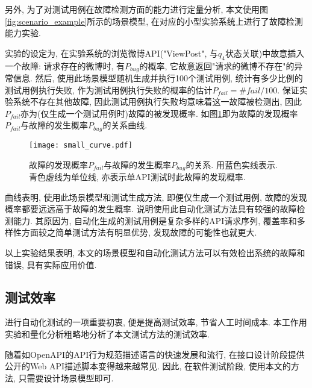             另外, 为了对测试用例在故障检测方面的能力进行定量分析, 本文使用图\ref{fig:scenario_example}所示的场景模型, 在对应的小型实验系统上进行了故障检测能力实验.
            
            实验的设定为, 在实验系统的浏览微博API("ViewPost", 与$q_4$状态关联)中故意插入一个故障: 请求存在的微博时, 有$P_{bug}$的概率, 它故意返回"请求的微博不存在"的异常信息. 然后, 使用此场景模型随机生成并执行100个测试用例, 统计有多少比例的测试用例执行失败, 作为测试用例执行失败的概率的估计$P_{fail} = \# fail / 100$. 保证实验系统不存在其他故障, 因此测试用例执行失败均意味着这一故障被检测出, 因此$P_{fail}$亦为(仅生成一个测试用例时)故障的被发现概率. 如图\ref{fig:pbug_pfail_graph}即为故障的发现概率$P_{fail}$与故障的发生概率$P_{bug}$的关系曲线.
            \begin{figure}[!htb]
                \centering
                \texttt{[image: small\_curve.pdf]}
                \caption[故障的发现概率$P_{fail}$与发生概率$P_{bug}$的关系]{故障的发现概率$P_{fail}$与故障的发生概率$P_{bug}$的关系. 用蓝色实线表示. 青色虚线为单位线, 亦表示单API测试时此故障的发现概率.}
                \label{fig:pbug_pfail_graph}
            \end{figure}
            曲线表明, 使用此场景模型和测试生成方法, 即便仅生成一个测试用例, 故障的发现概率都要远远高于故障的发生概率. 说明使用此自动化测试方法具有较强的故障检测能力. 其原因为, 自动化生成的测试用例是复杂多样的API请求序列, 覆盖率和多样性方面较之简单测试方法有明显优势, 发现故障的可能性也就更大.
            
            以上实验结果表明, 本文的场景模型和自动化测试方法可以有效检出系统的故障和错误, 具有实际应用价值.
    
        \subsection{测试效率}
    
            进行自动化测试的一项重要初衷, 便是提高测试效率, 节省人工时间成本. 本工作用实验和量化分析粗略地分析了本文测试方法的测试效率.
            
            随着如OpenAPI的API行为规范描述语言的快速发展和流行, 在接口设计阶段提供公开的Web API描述脚本变得越来越常见. 因此, 在软件测试阶段, 使用本文的方法, 只需要设计场景模型即可.
            
